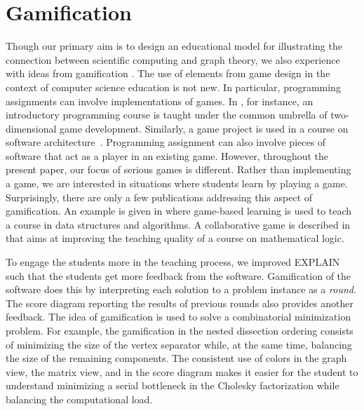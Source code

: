 \documentclass[12pt, twoside,a4paper,toc=bibliography]{scrbook}
\begin{document}
\section{Gamification}
\label{s.game}
Though our primary aim is to design an educational model for illustrating the connection between
scientific computing and graph theory, we also experience with ideas from gamification
\cite{deterding2011:gug,deterding2011}. The use of elements from game design in the context of
computer science education is not new. In particular, programming assignments can involve
implementations of games. In \cite{la2007:gfa}, for instance, an introductory programming course is
taught under the common umbrella of two-dimensional game development. Similarly, a game project is
used in a course on software architecture~\cite{Wang2011:EEU}. Programming assignment can also
involve pieces of software that act as a player in an existing game. However, throughout the
present paper, our focus of serious games is different. Rather than implementing a game, we are
interested in situations where students learn by playing a game. Surprisingly, there are only a few
publications addressing this aspect of gamification. An example is given in
\cite{Hakulinen2011:usg} where game-based learning is used to teach a course in data structures and
algorithms. A collaborative game is described in \cite{shl:bsc} that aims at improving the teaching
quality of a course on mathematical logic.

To engage the students more in the teaching process, we improved EXPLAIN such that the students get
more feedback from the software. Gamification of the software does this by interpreting each
solution to a problem instance as a \textit{round}. The score diagram reporting the results of previous
rounds also provides another feedback. The idea of gamification is used to solve a combinatorial
minimization problem. For example, the gamification in the nested dissection ordering 
consists of minimizing the size of the vertex separator while, at the same
time, balancing the size of the remaining components. The consistent use of colors in the graph
view, the matrix view, and in the score diagram makes it easier for the student to understand
minimizing a serial bottleneck in the Cholesky factorization while balancing the computational load.
\end{document}
